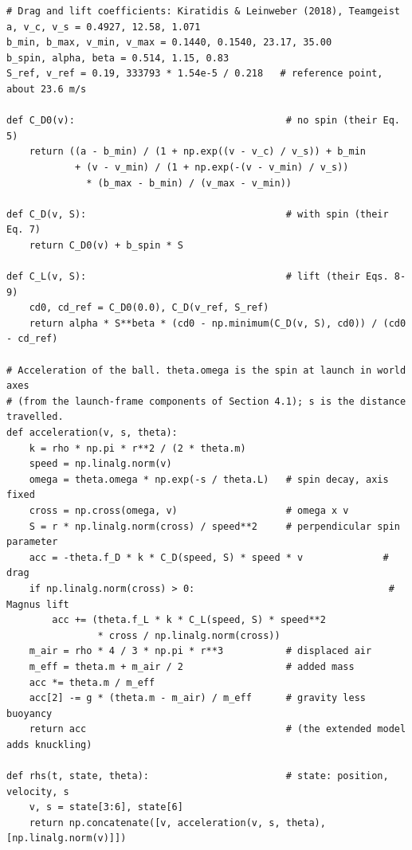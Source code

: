 \documentclass[10pt,a4paper]{article}
\begin{document}
\begin{lstlisting}[caption={Coefficients, acceleration and input sampling (standard model). Units are SI; spin is in rad/s.}, label=lst:physics, captionpos=b]
# Drag and lift coefficients: Kiratidis & Leinweber (2018), Teamgeist
a, v_c, v_s = 0.4927, 12.58, 1.071
b_min, b_max, v_min, v_max = 0.1440, 0.1540, 23.17, 35.00
b_spin, alpha, beta = 0.514, 1.15, 0.83
S_ref, v_ref = 0.19, 333793 * 1.54e-5 / 0.218   # reference point, about 23.6 m/s

def C_D0(v):                                     # no spin (their Eq. 5)
    return ((a - b_min) / (1 + np.exp((v - v_c) / v_s)) + b_min
            + (v - v_min) / (1 + np.exp(-(v - v_min) / v_s))
              * (b_max - b_min) / (v_max - v_min))

def C_D(v, S):                                   # with spin (their Eq. 7)
    return C_D0(v) + b_spin * S

def C_L(v, S):                                   # lift (their Eqs. 8-9)
    cd0, cd_ref = C_D0(0.0), C_D(v_ref, S_ref)
    return alpha * S**beta * (cd0 - np.minimum(C_D(v, S), cd0)) / (cd0 - cd_ref)

# Acceleration of the ball. theta.omega is the spin at launch in world axes
# (from the launch-frame components of Section 4.1); s is the distance travelled.
def acceleration(v, s, theta):
    k = rho * np.pi * r**2 / (2 * theta.m)
    speed = np.linalg.norm(v)
    omega = theta.omega * np.exp(-s / theta.L)   # spin decay, axis fixed
    cross = np.cross(omega, v)                   # omega x v
    S = r * np.linalg.norm(cross) / speed**2     # perpendicular spin parameter
    acc = -theta.f_D * k * C_D(speed, S) * speed * v              # drag
    if np.linalg.norm(cross) > 0:                                  # Magnus lift
        acc += (theta.f_L * k * C_L(speed, S) * speed**2
                * cross / np.linalg.norm(cross))
    m_air = rho * 4 / 3 * np.pi * r**3           # displaced air
    m_eff = theta.m + m_air / 2                  # added mass
    acc *= theta.m / m_eff
    acc[2] -= g * (theta.m - m_air) / m_eff      # gravity less buoyancy
    return acc                                   # (the extended model adds knuckling)

def rhs(t, state, theta):                        # state: position, velocity, s
    v, s = state[3:6], state[6]
    return np.concatenate([v, acceleration(v, s, theta), [np.linalg.norm(v)]])


\end{lstlisting}
\end{document}
